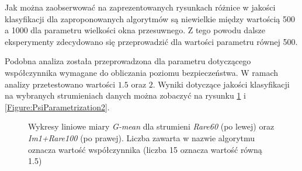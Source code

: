 \newpage

\noindent Jak można zaobserwować na zaprezentowanych rysunkach różnice w jakości klasyfikacji dla zaproponowanych algorytmów są niewielkie między wartością 500 a 1000 dla parametru wielkości okna przesuwnego. Z tego powodu dalsze eksperymenty zdecydowano się przeprowadzić dla wartości parametru równej 500.

Podobna analiza została przeprowadzona dla parametru dotyczącego współczynnika wymagane do obliczania poziomu bezpieczeństwa. W ramach analizy przetestowano wartości $1.5$ oraz $2$. Wyniki dotyczące jakości klasyfikacji na wybranych strumieniach danych można zobaczyć na rysunku \ref{Figure:PsiParametrization1} i \ref{Figure:PsiParametrization2}.

\begin{figure}[h]
    \centering
    \qquad
    \caption{Wykresy liniowe miary \textit{G-mean} dla strumieni \textit{Rare60} (po lewej) oraz \textit{Im1+Rare100} (po prawej). Liczba zawarta w nazwie algorytmu oznacza wartość współczynnika (liczba 15 oznacza wartość równą 1.5)}\label{Figure:PsiParametrization1}
\end{figure}

